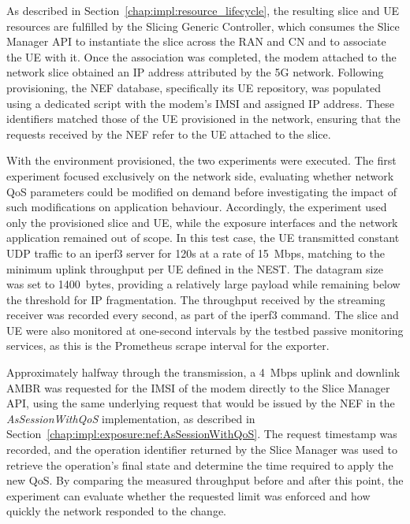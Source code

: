 As described in Section~\ref{chap:impl:resource_lifecycle}, the resulting slice and \acs{UE} resources are fulfilled by the Slicing Generic Controller, which consumes the Slice Manager \acs{API} to instantiate the slice across the \acs{RAN} and \acs{CN} and to associate the \acs{UE} with it. Once the association was completed, the modem attached to the network slice obtained an \acs{IP} address attributed by the \acs{5G} network. Following provisioning, the \acs{NEF} database, specifically its \acs{UE} repository, was populated using a dedicated script with the modem's \acs{IMSI} and assigned \acs{IP} address. These identifiers matched those of the \acs{UE} provisioned in the network, ensuring that the requests received by the \acs{NEF} refer to the \acs{UE} attached to the slice.

With the environment provisioned, the two experiments were executed. The first experiment focused exclusively on the network side, evaluating whether network \acs{QoS} parameters could be modified on demand before investigating the impact of such modifications on application behaviour. Accordingly, the experiment used only the provisioned slice and \acs{UE}, while the exposure interfaces and the network application remained out of scope. In this test case, the \acs{UE} transmitted constant \acs{UDP} traffic to an iperf3 server for 120s at a rate of 15~Mbps, matching to the minimum uplink throughput per \acs{UE} defined in the \acs{NEST}. The datagram size was set to 1400~bytes, providing a relatively large payload while remaining below the threshold for \acs{IP} fragmentation. The throughput received by the streaming receiver was recorded every second, as part of the iperf3 command. The slice and \acs{UE} were also monitored at one-second intervals by the testbed passive monitoring services, as this is the Prometheus scrape interval for the exporter.

Approximately halfway through the transmission, a 4~Mbps uplink and downlink \acs{AMBR} was requested for the \acs{IMSI} of the modem directly to the Slice Manager \acs{API}, using the same underlying request that would be issued by the \acs{NEF} in the \textit{AsSessionWithQoS} implementation, as described in Section~\ref{chap:impl:exposure:nef:AsSessionWithQoS}. The request timestamp was recorded, and the operation identifier returned by the Slice Manager was used to retrieve the operation’s final state and determine the time required to apply the new \acs{QoS}. By comparing the measured throughput before and after this point, the experiment can evaluate whether the requested limit was enforced and how quickly the network responded to the change.

